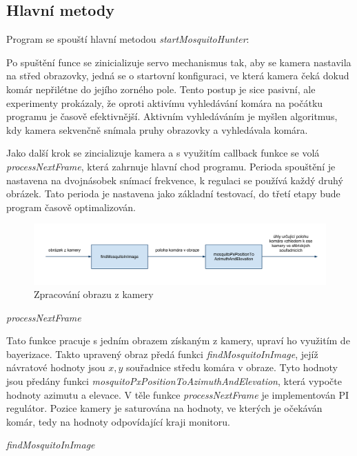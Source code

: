 \documentclass[a4paper,10pt]{article}
\begin{document}
\subsection{Hlavní metody}

		Program se spouští hlavní metodou \textit{startMosquitoHunter}:

		Po spuštění funce se zinicializuje servo mechanismus tak, aby se kamera
		nastavila na střed obrazovky, jedná se o startovní konfiguraci, ve která kamera
		čeká dokud komár nepřilétne do jejího zorného pole. Tento postup je sice
		pasivní, ale experimenty prokázaly, že oproti aktivímu vyhledávání komára na
		počátku programu je časově efektivnější. Aktivním vyhledáváním je myšlen
		algoritmus, kdy kamera sekvenčně snímala pruhy obrazovky a vyhledávala komára.

		Jako další krok se zincializuje kamera a s využitím
		callback funkce se volá \textit{processNextFrame}, která zahrnuje hlavní chod
		programu. Perioda spouštění je nastavena na dvojnásobek snímací frekvence, k regulaci se používá každý druhý obrázek.
		Tato perioda je nastavena jako základní testovací, do třetí etapy bude program časově optimalizován.

		\begin{figure}[!h]
			\centering
			 \includegraphics[width=1\columnwidth]{pics/zpracovani_obrazu_z_kamery}
			 \caption{Zpracování obrazu z kamery\label{fig:zpracovaniObrazu}}
		\end{figure}


\vspace{0.5cm}
\textit{processNextFrame}

		Tato funkce pracuje s jedním obrazem získaným z kamery, upraví ho využitím de
		bayerizace. Takto upravený obraz předá funkci \textit{findMosquitoInImage},
		jejíž návratové hodnoty jsou $x, y$ souřadnice středu komára v obraze. Tyto
		hodnoty jsou předány funkci \textit{mosquitoPxPositionToAzimuthAndElevation},
		která vypočte hodnoty azimutu a elevace. V těle funkce \textit{processNextFrame}
		je implementován PI regulátor. Pozice kamery je saturována na hodnoty, ve
		kterých je očekáván komár, tedy na hodnoty odpovídající kraji monitoru. 

		\vspace{0.5cm}
		\textit{findMosquitoInImage}
\end{document}
